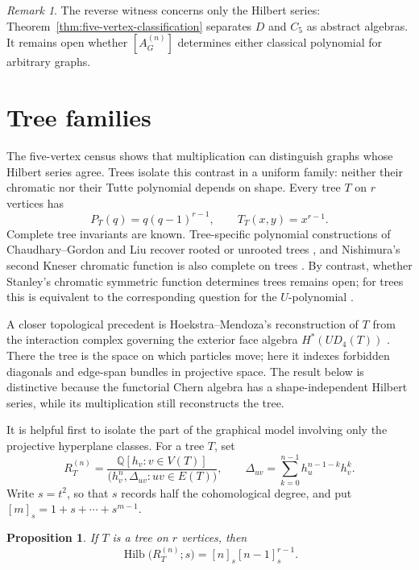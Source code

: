 \documentclass[11pt]{amsart}
\theoremstyle{plain}
\newtheorem{proposition}[theorem]{Proposition}
\theoremstyle{definition}
\theoremstyle{remark}
\newtheorem{remark}[theorem]{Remark}
\newcommand{\Q}{\mathbb{Q}}
\begin{document}
\begin{remark}
The reverse witness concerns only the Hilbert series:
Theorem~\ref{thm:five-vertex-classification} separates $D$ and $C_5$ as
abstract algebras.  It remains open whether $[A_G^{(n)}]$ determines either
classical polynomial for arbitrary graphs.
\end{remark}

\section{Tree families}\label{sec:tree-families}

The five-vertex census shows that multiplication can distinguish graphs whose
Hilbert series agree.  Trees isolate this contrast in a uniform family: neither
their chromatic nor their Tutte polynomial depends on shape.  Every tree $T$
on $r$ vertices has
\[
  P_T(q)=q(q-1)^{r-1},
  \qquad
  T_T(x,y)=x^{r-1}.
\]
Complete tree invariants are known.  Tree-specific polynomial constructions
of Chaudhary--Gordon and Liu recover rooted or unrooted trees
\cite{ChaudharyGordon,LiuTreePolynomial}, and Nishimura's second Kneser
chromatic function is also complete on trees \cite{NishimuraKneser}.  By
contrast, whether Stanley's chromatic symmetric function determines trees
remains open; for trees this is equivalent to the corresponding question for
the $U$-polynomial \cite{StanleyChromaticSymmetric,NobleWelsh,AlisteDeMierZamora}.

A closer topological precedent is Hoekstra--Mendoza's reconstruction of $T$
from the interaction complex governing the exterior face algebra
$H^*(UD_4(T))$ \cite{HoekstraMendoza}.  There the tree is the space on which
particles move; here it indexes forbidden diagonals and edge-span bundles in
projective space.  The result below is distinctive because the functorial
Chern algebra has a shape-independent Hilbert series, while its multiplication
still reconstructs the tree.

It is helpful first to isolate the part of the graphical model involving only
the projective hyperplane classes.  For a tree $T$, set
\[
  R_T^{(n)}=
  \frac{\Q[h_v:v\in V(T)]}
  {\bigl(h_v^n,\Delta_{uv}:uv\in E(T)\bigr)},
  \qquad
  \Delta_{uv}=\sum_{k=0}^{n-1}h_u^{n-1-k}h_v^k.
\]
Write $s=t^2$, so that $s$ records half the cohomological degree, and put
$[m]_s=1+s+\cdots+s^{m-1}$.

\begin{proposition}\label{prop:tree-r-hilbert}
If $T$ is a tree on $r$ vertices, then
\begin{equation}\label{eq:tree-r-hilbert}
  \operatorname{Hilb}\bigl(R_T^{(n)};s\bigr)
  =[n]_s[n-1]_s^{r-1}.
\end{equation}
\end{proposition}
\end{document}
